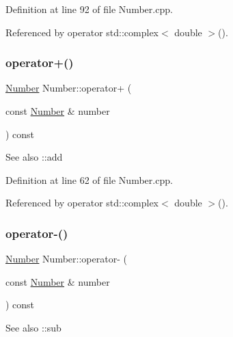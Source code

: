 Definition at line 92 of file Number.\+cpp.



Referenced by operator std\+::complex$<$ double $>$().

\mbox{\label{classteam22_1_1_math_1_1_number_abb2fc73931fb5e27e026cfedc79fdc31}} 
\subsubsection{\texorpdfstring{operator+()}{operator+()}}
{\footnotesize\ttfamily \hyperlink{classteam22_1_1_math_1_1_number}{Number} Number\+::operator+ (\begin{DoxyParamCaption}\item[{const \hyperlink{classteam22_1_1_math_1_1_number}{Number} \&}]{number }\end{DoxyParamCaption}) const}

\begin{DoxySeeAlso}{See also}
\+::add 
\end{DoxySeeAlso}


Definition at line 62 of file Number.\+cpp.



Referenced by operator std\+::complex$<$ double $>$().

\mbox{\label{classteam22_1_1_math_1_1_number_a5268ed342eae099e45a30541bb34e734}} 
\subsubsection{\texorpdfstring{operator-\/()}{operator-()}}
{\footnotesize\ttfamily \hyperlink{classteam22_1_1_math_1_1_number}{Number} Number\+::operator-\/ (\begin{DoxyParamCaption}\item[{const \hyperlink{classteam22_1_1_math_1_1_number}{Number} \&}]{number }\end{DoxyParamCaption}) const}

\begin{DoxySeeAlso}{See also}
\+::sub 
\end{DoxySeeAlso}


